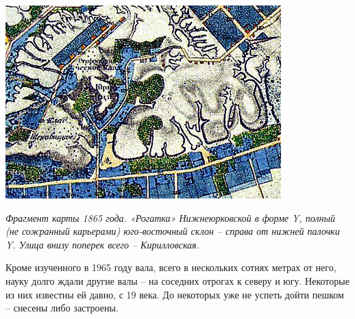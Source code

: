 

\begin{center}
\includegraphics[width=\linewidth]{chast-kirvys/lys02/1865.png}

\textit{Фрагмент карты 1865 года. «Рогатка» Нижнеюрковской в форме Y, полный (не сожранный карьерами) юго-восточный склон – справа от нижней палочки Y. Улица внизу поперек всего – Кирилловская.}
\end{center}

Кроме изученного в 1965 году вала, всего в нескольких сотнях метрах от него, науку долго ждали другие валы – на соседних отрогах к северу и югу. Некоторые из них известны ей давно, с 19 века. До некоторых уже не успеть дойти пешком – снесены либо застроены.


